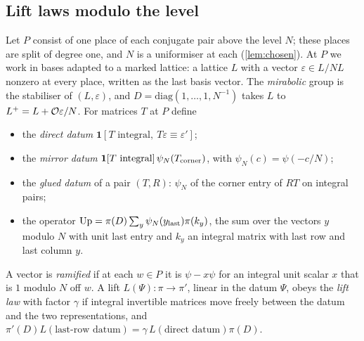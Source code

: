 \subsection{Lift laws modulo the level}\label{ss:lift-laws}
Let $P$ consist of one place of each conjugate pair above the level $N$; these places are split of degree
one, and $N$ is a uniformiser at each (\cref{lem:chosen}). At $P$ we work in bases adapted to a marked lattice:
a lattice $L$ with a vector $\varepsilon\in L/NL$ nonzero at every place, written as the last basis vector. The
\emph{mirabolic} group is the stabiliser of $(L,\varepsilon)$, and $D=\mathrm{diag}(1,\dots,1,N^{-1})$ takes $L$ to
$L^+=L+\mathcal{O}\varepsilon/N$. For matrices $T$ at $P$ define
\begin{itemize}[leftmargin=1.5em]
\item the \emph{direct datum} $\mathbf1[T\text{ integral},\ T\varepsilon\equiv\varepsilon']$;
\item the \emph{mirror datum} $\mathbf1[T\text{ integral}]\,\psi_N(T_{\rm corner})$, with $\psi_N(c)=\psi(-c/N)$;
\item the \emph{glued datum} of a pair $(T,R)$: $\psi_N$ of the corner entry of $RT$ on integral pairs;
\item the operator $\mathrm{Up}=\pi(D)\sum_y\psi_N(y_{\rm last})\pi(k_y)$, the sum over the vectors $y$ modulo $N$
with unit last entry and $k_y$ an integral matrix with last row and last column $y$.
\end{itemize}
A vector is \emph{ramified} if at each $w\in P$ it is $\psi-x\psi$ for an integral unit scalar $x$ that is $1$
modulo $N$ off $w$. A lift $L(\Psi)\colon\pi\to\pi'$, linear in the datum $\Psi$, obeys the \emph{lift law} with
factor $\gamma$ if integral invertible matrices move freely between the datum and the two representations,
and $\pi'(D)L(\text{last-row datum})=\gamma\,L(\text{direct datum})\pi(D)$.

